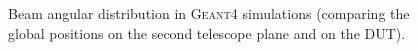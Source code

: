 \begin{figure}[htbp]
\begin{subfigure}[b]{0.45\textwidth}
    \caption{}
  \end{subfigure}
  \caption{Beam angular distribution in \textsc{Geant4} simulations
(comparing the global positions on the second telescope plane and on
the DUT).}
  \label{fig:MCbeamAngleDistr}
\end{figure}
